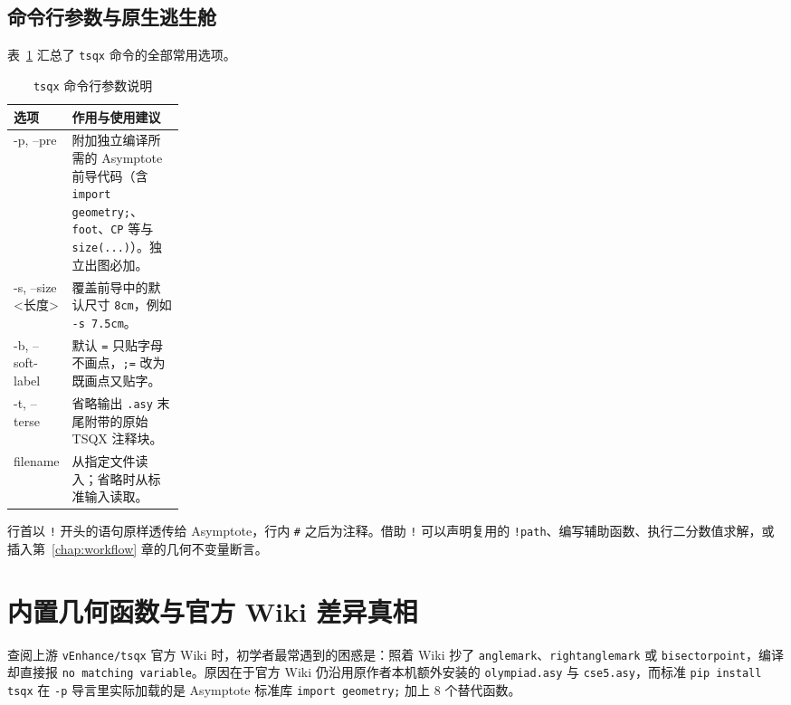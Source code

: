 \documentclass[11pt,oneside,fontset=none]{ctexbook}
\newcommand{\code}[1]{\texttt{#1}}
\begin{document}
\section{命令行参数与原生逃生舱}

表~\ref{tab:cli-flags} 汇总了 \code{tsqx} 命令的全部常用选项。

\begin{table}[htbp]
  \centering
  \caption{\texttt{tsqx} 命令行参数说明}
  \label{tab:cli-flags}
  \small
  \begin{tabularx}{\linewidth}{@{}>{\ttfamily}p{0.22\linewidth}X@{}}
    \toprule
    选项 & 作用与使用建议 \\
    \midrule
    -p, --pre & 附加独立编译所需的 Asymptote 前导代码（含 \code{import geometry;}、\code{foot}、\code{CP} 等与 \code{size(...)}）。独立出图必加。 \\
    -s, --size <长度> & 覆盖前导中的默认尺寸 \code{8cm}，例如 \code{-s 7.5cm}。 \\
    -b, --soft-label & 默认 \code{=} 只贴字母不画点，\code{;=} 改为既画点又贴字。 \\
    -t, --terse & 省略输出 \code{.asy} 末尾附带的原始 TSQX 注释块。 \\
    filename & 从指定文件读入；省略时从标准输入读取。 \\
    \bottomrule
  \end{tabularx}
\end{table}

行首以 \code{!} 开头的语句原样透传给 Asymptote，行内 \code{\#} 之后为注释。借助 \code{!} 可以声明复用的 \code{!path}、编写辅助函数、执行二分数值求解，或插入第~\ref{chap:workflow} 章的几何不变量断言。

\chapter{内置几何函数与官方 Wiki 差异真相}
\label{chap:functions}

查阅上游 \code{vEnhance/tsqx} 官方 Wiki 时，初学者最常遇到的困惑是：照着 Wiki 抄了 \code{anglemark}、\code{rightanglemark} 或 \code{bisectorpoint}，编译却直接报 \code{no matching variable}。原因在于官方 Wiki 仍沿用原作者本机额外安装的 \code{olympiad.asy} 与 \code{cse5.asy}，而标准 \code{pip install tsqx} 在 \code{-p} 导言里实际加载的是 Asymptote 标准库 \code{import geometry;} 加上 8 个替代函数。
\end{document}

